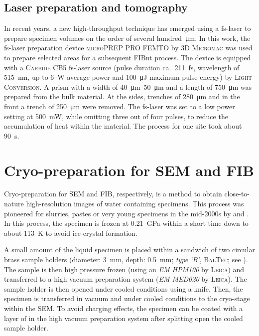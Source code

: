 \subsection{Laser preparation and tomography}

In recent years, a new high-throughput technique has emerged using a \ac{fs-laser} to prepare specimen volumes on the order of several hundred~\unit{\micro\meter}.
In this work, the \ac{fs-laser} preparation device \textsc{microPREP PRO FEMTO} by \textsc{3D Micromac} was used to prepare selected areas for a subsequent \ac{FIBnt} process.
The device is equipped with a \textsc{Carbide CB5} \ac{fs-laser} source (pulse duration ca.~\qty{211}{\femto\second}, wavelength of \qty{515}{\nano\meter}, up to \qty{6}{\watt} average power and \qty{100}{\micro\joule} maximum pulse energy) by \textsc{Light Conversion}.
A prism with a width of \qtyrange{40}{50}{\micro\meter} and a length of \qty{750}{\micro\meter} was prepared from the bulk material.
At the sides, trenches of \qty{280}{\micro\meter} and in the front a trench of \qty{250}{\micro\meter} were removed.
The \ac{fs-laser} was set to a low power setting at \qty{500}{\milli\watt}, while omitting three out of four pulses, to reduce the accumulation of heat within the material.
The process for one site took about \qty{90}{\second}.

\section{Cryo-preparation for \acs*{SEM} and \acs*{FIB}}
\label{sec:cryofibnt}

Cryo-preparation for \ac{SEM} and \ac{FIB}, respectively, is a method to obtain close-to-nature high-resolution images of water containing specimens.
This process was pioneered for slurries, pastes or very young specimens in the mid-2000s by \textcite{holzer.2007} and \textcite{zingg.2008}.
In this process, the specimen is frozen at \qty{0.21}{\giga\pascal} within a short time down to about \qty{113}{\kelvin} to avoid ice-crystal formation.

A small amount of the liquid specimen is placed within a sandwich of two circular brass sample holders (diameter: \qty{3}{\milli\meter}, depth: \qty{0.5}{\milli\meter}; \textit{type `B'}, \textsc{BalTec}; see ).
The sample is then high pressure frozen (using an \textit{EM HPM100} by \textsc{Leica}) and transferred to a high vacuum preparation system (\textit{EM MED020} by \textsc{Leica}).
The sample holder is then opened under cooled conditions using a knife.
Then, the specimen is transferred in vacuum and under cooled conditions to the cryo-stage within the \ac{SEM}.
To avoid charging effects, the specimen can be coated with a layer of  in the high vacuum preparation system after splitting open the cooled sample holder.

